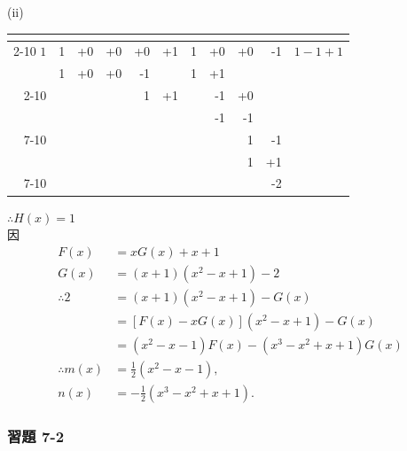 \begin{example}
(ii)
\begin{center}
\renewcommand{\arraystretch}{1.2}
\begin{tabular}{r|rrrrr|rrrr|l}
\multicolumn{1}{c}{} & \multicolumn{5}{c}{} & \multicolumn{4}{c}{} & \\ \cline{2-10}
$1$ & 1 & +0 & +0 & +0 & +1 & 1 & +0 & +0 & -1 & $1-1+1$ \\
    & 1 & +0 & +0 & -1 &    & 1 & +1 &    &    & \\ \cline{2-10}
    &   &    &    & 1  & +1 &   & -1 & +0 &    & \\
    &   &    &    &    &    &   & -1 & -1 &    & \\ \cline{7-10}
    &   &    &    &    &    &   &    & 1  & -1 & \\
    &   &    &    &    &    &   &    & 1  & +1 & \\ \cline{7-10}
    &   &    &    &    &    &   &    &    & -2 &
\end{tabular}
\end{center}
$\therefore H(x) = 1$\\
因
\begin{align*}
  F(x) &= xG(x) + x+1 \\
  G(x) &= (x+1)(x^2-x+1) - 2 \\
  \therefore 2 &= (x+1)(x^2-x+1) - G(x) \\
  &= [F(x)-xG(x)](x^2-x+1) - G(x) \\
  &= (x^2-x-1)F(x) - (x^3-x^2+x+1)G(x) \\
  \therefore m(x) &= \frac{1}{2}(x^2-x-1), \\
  n(x) &= -\frac{1}{2}(x^3-x^2+x+1).
\end{align*}
\end{example}

\subsubsection*{習題 7-2}\label{sec:ex7-2}

